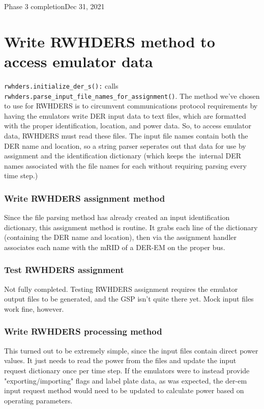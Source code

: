 \begin{entry}{Phase 3 completion}{Dec 31, 2021}
    \section*{Write RWHDERS method to access emulator data}
    \verb|rwhders.initialize_der_s():| calls \verb|rwhders.parse_input_file_names_for_assignment()|. The method we've
    chosen to use for RWHDERS is to circumvent communications protocol requirements by having the emulators write
    DER input data to text files, which are formatted with the proper identification, location, and power data. So, to
    access emulator data, RWHDERS must read these files. The input file names contain both the DER name and location, so
    a string parser seperates out that data for use by assignment and the identification dictionary (which keeps the\
    internal DER names associated with the file names for each without requiring parsing every time step.)

    \subsubsection*{Write RWHDERS assignment method}
    Since the file parsing method has already created an input identification dictionary, this assignment method is
    routine. It grabs each line of the dictionary (containing the DER name and location), then via the assignment handler
    associates each name with the mRID of a DER-EM on the proper bus.

    \subsubsection*{Test RWHDERS assignment}
    Not fully completed. Testing RWHDERS assignment requires the emulator output files to be generated, and the GSP isn't
    quite there yet. Mock input files work fine, however.

    \subsubsection*{Write RWHDERS processing method}
    This turned out to be extremely simple, since the input files contain direct power values. It just needs to read the
    power from the files and update the input request dictionary once per time step. If the emulators were to instead
    provide "exporting/importing" flags and label plate data, as was expected, the der-em input request method would
    need to be updated to calculate power based on operating parameters.



\end{entry}
